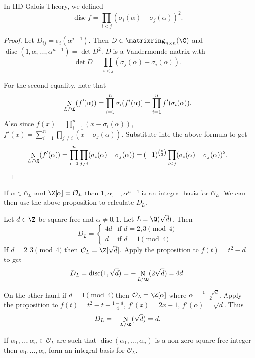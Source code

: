 \documentclass[a4paper]{article}
\renewcommand*{\O}{\mathcal{O}}
\DeclareMathOperator{\n}{N}
\DeclareMathOperator{\disc}{disc}
\begin{document}
\begin{note}
  In IID Galois Theory, we defined
  \[
    \disc f = \prod_{i < j} (\sigma_i(\alpha) - \sigma_j(\alpha))^2.
  \]
\end{note}

\begin{proof}
  Let \(D_{ij} = \sigma_i(\alpha^{j - 1})\). Then \(D \in \matrixring_{n \times n}(\C)\) and \(\disc(1, \alpha, \dots, \alpha^{n -1}) = \det D^2\). \(D\) is a Vandermonde matrix with
  \[
    \det D = \prod_{i < j} (\sigma_j(\alpha) - \sigma_i(\alpha)).
  \]

  For the second equality, note that
  \[
    \n_{L/\Q}(f'(\alpha))
    = \prod_{i = 1}^n \sigma_i(f'(\alpha))
    = \prod_{i = 1}^n f'(\sigma_i(\alpha)).
  \]
  Also since \(f(x) = \prod_{i = 1}^n (x - \sigma_i(\alpha))\), \(f'(x) = \sum_{i = 1}^n\prod_{j \neq i} (x - \sigma_j(\alpha))\). Substitute into the above formula to get
  \[
    \n_{L/\Q}(f'(\alpha))
    = \prod_{i = 1}^n \prod_{j \neq i} (\sigma_i(\alpha) - \sigma_j(\alpha))
    = (-1)^{\binom{n}{2}} \prod_{i < j}(\sigma_i(\alpha) - \sigma_j(\alpha))^2.
  \]
\end{proof}

\begin{note}
  If \(\alpha \in \O_L\) and \(\Z[\alpha] = \O_L\) then \(1, \alpha, \dots, \alpha^{n -1}\) is an integral basis for \(\O_L\). We can then use the above proposition to calculate \(D_L\).
\end{note}

\begin{eg}
  Let \(d \in \Z\) be square-free and \(\alpha \neq 0, 1\). Let \(L = \Q(\sqrt d)\). Then
  \[
    D_L =
    \begin{cases}
      4d & \text{if } d = 2, 3 \pmod 4 \\
      d & \text{if } d = 1 \pmod 4
    \end{cases}
  \]
  If \(d = 2, 3 \pmod 4\) then \(\O_L = \Z[\sqrt d]\). Apply the proposition to \(f(t) = t^2 - d\) to get
  \[
    D_L = \disc(1, \sqrt d) = -\n_{L/\Q}(2\sqrt d) = 4d.
  \]

  On the other hand if \(d = 1 \pmod 4\) then \(\O_L = \Z[\alpha]\) where \(\alpha  = \frac{1 + \sqrt d}{2}\). Apply the proposition to \(f(t) = t^2 - t + \frac{1 - d}{4}\), \(f'(x) = 2x - 1\), \(f'(\alpha) = \sqrt d\). Thus
  \[
    D_L = -\n_{L/\Q}(\sqrt d) = d.
  \]
\end{eg}

\begin{proposition}
  If \(\alpha_1, \dots, \alpha_n \in \O_L\) are such that \(\disc(\alpha_1, \dots, \alpha_n)\) is a non-zero square-free integer then \(\alpha_1, \dots, \alpha_n\) form an integral basis for \(\O_L\).
\end{proposition}
\end{document}
